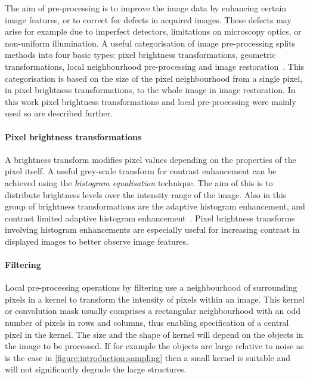 The aim of pre-processing is to improve the image data by enhancing certain image features, or to correct for defects in acquired images. These defects may arise for example due to imperfect detectors, limitations on microscopy optics, or non-uniform illumination. A useful categorisation of image pre-processing splits methods into four basic types: pixel brightness transformations, geometric transformations, local neighbourhood pre-processing and image restoration~\cite{Sonka2007}. This categorisation is based on the size of the pixel neighbourhood from a single pixel, in pixel brightness transformations, to the whole image in image restoration. In this work pixel brightness transformations and local pre-processing were mainly used so are described further.

\paragraph{Pixel brightness transformations} A brightness transform modifies pixel values depending on the properties of the pixel itself. A useful grey-scale transform for contrast enhancement can be achieved using the \emph{histogram equalisation} technique. The aim of this is to distribute brightness levels over the intensity range of the image. Also in this group of brightness transformations are the adaptive histogram enhancement, and contrast limited adaptive histogram enhancement~\cite{Ketcham1974}. Pixel brightness transforms involving histogram enhancements are especially useful for increasing contrast in displayed images to better observe image features.

\paragraph{Filtering} Local pre-processing operations by filtering use a neighbourhood of surrounding pixels in a kernel to transform the intensity of pixels within an image. This kernel or convolution mask usually comprises a rectangular neighbourhood with an odd number of pixels in rows and columns, thus enabling specification of a central pixel in the kernel. The size and the shape of kernel will depend on the objects in the image to be processed. If for example the objects are large relative to noise as is the case in \autoref{figure:introduction:sampling} then a small kernel is suitable and  will not significantly degrade the large structures.

